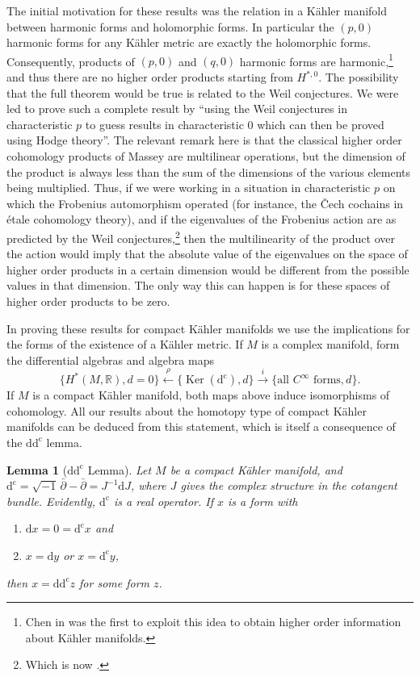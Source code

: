 \documentclass[11pt]{amsart}
\theoremstyle{plain}
\newtheorem{lemma}[theorem]{Lemma}
\theoremstyle{definition}
\DeclareMathOperator{\Ker}{Ker}
\newcommand{\dd}{\mathrm{d}}
\newcommand{\dc}{\mathrm{d}^{\mathrm{c}}}
\newcommand{\RR}{\mathbb{R}}
\begin{document}
The initial motivation for these results was the relation in a K\"ahler manifold between harmonic forms and holomorphic forms. In particular the $(p,0)$ harmonic forms for any K\"ahler metric are exactly the holomorphic forms. Consequently, products of $(p,0)$ and $(q,0)$ harmonic forms are harmonic,\footnote{Chen in \cite{C} was the first to exploit this idea to obtain higher order information about K\"ahler manifolds.} and thus there are no higher order products starting from $H^{*,0}$. The possibility that the full theorem would be true is related to the Weil conjectures. We were led to prove such a complete result by ``using the Weil conjectures in characteristic $p$ to guess results in characteristic $0$ which can then be proved using Hodge theory''. The relevant remark here is that the classical higher order cohomology products of Massey are multilinear operations, but the dimension of the product is always less than the sum of the dimensions of the various elements being multiplied. Thus, if we were working in a situation in characteristic $p$ on which the Frobenius automorphism operated (for instance, the \v{C}ech cochains in \'etale cohomology theory), and if the eigenvalues of the Frobenius action are as predicted by the Weil conjectures,\footnote{Which is now \cite{D2}.} then the multilinearity of the product over the action would imply that the absolute value of the eigenvalues on the space of higher order products in a certain dimension would be different from the possible values in that dimension. The only way this can happen is for these spaces of higher order products to be zero.

In proving these results for compact K\"ahler manifolds we use the implications for the forms of the existence of a K\"ahler metric. If $M$ is a complex manifold, form the differential algebras and algebra maps
\[
\{H^{*}(M,\RR), d=0\} \xleftarrow{\rho} \{\Ker(\dc), d\} \xrightarrow{i} \{\text{all } C^{\infty}\text{ forms}, d\}.
\]
If $M$ is a compact K\"ahler manifold, both maps above induce isomorphisms of cohomology. All our results about the homotopy type of compact K\"ahler manifolds can be deduced from this statement, which is itself a consequence of the $\dd\dc$ lemma.

\begin{lemma}[$\dd\dc$ Lemma]
Let $M$ be a compact K\"ahler manifold, and $\dc = \sqrt{-1}\, \bar{\partial} - \bar{\partial} = J^{-1}\dd J$, where $J$ gives the complex structure in the cotangent bundle. Evidently, $\dc$ is a real operator. If $x$ is a form with
\begin{enumerate}
\item[(1)] $\dd x = 0 = \dc x$ and
\item[(2)] $x = \dd y$ or $x = \dc y$,
\end{enumerate}
then $x = \dd\dc z$ for some form $z$.
\end{lemma}
\end{document}
